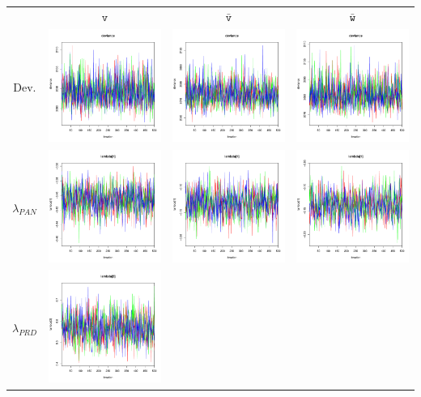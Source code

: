 \documentclass[letter,12pt]{article}
\begin{document}
\begin{table}
\centering
\begin{tabular}{cccc}
                     & $\texttt{v}$ & $\bar{\texttt{v}}$ & $\bar{\texttt{w}}$ \\ 
    Dev.             & \includegraphics[width=.15\columnwidth]{../graphs/traceplots/2003d0v_1.pdf} &
                        \includegraphics[width=.15\columnwidth]{../graphs/traceplots/2003d0vbar_1.pdf} &
                         \includegraphics[width=.15\columnwidth]{../graphs/traceplots/2003d0wbar_1.pdf} \\
    $\lambda_{PAN}$   & \includegraphics[width=.15\columnwidth]{../graphs/traceplots/2003d0v_2.pdf} &
                        \includegraphics[width=.15\columnwidth]{../graphs/traceplots/2003d0vbar_2.pdf} &
                         \includegraphics[width=.15\columnwidth]{../graphs/traceplots/2003d0wbar_2.pdf} \\
    $\lambda_{PRD}$   & \includegraphics[width=.15\columnwidth]{../graphs/traceplots/2003d0v_3.pdf} &

\end{tabular}
\end{table}
\end{document}
